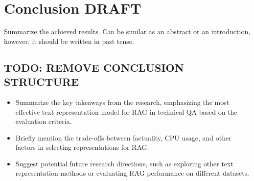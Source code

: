 
\chapter{Conclusion DRAFT\label{chap:conclusion}}

Summarize the achieved results.
Can be similar as an abstract or an introduction, however, it should be written in past tense.

\section{TODO: REMOVE CONCLUSION STRUCTURE}
\begin{itemize}
    \item Summarize the key takeaways from the research, emphasizing the most effective text representation model for RAG in technical QA based on the evaluation criteria.
    \item Briefly mention the trade-offs between factuality, CPU usage, and other factors in selecting representations for RAG.
    \item Suggest potential future research directions, such as exploring other text representation methods or evaluating RAG performance on different datasets.
\end{itemize}




